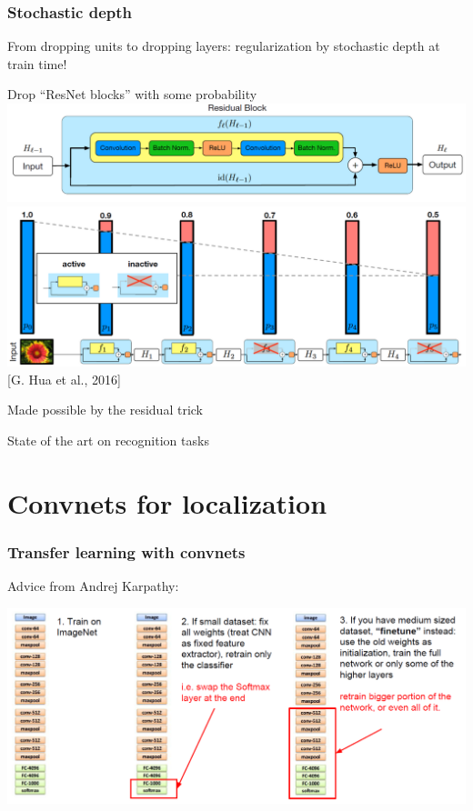 \documentclass[xcolor=dvipsnames]{beamer}
\begin{document}
\begin{frame}
  \frametitle{Stochastic depth}
  \bi
\item From dropping units to dropping layers: regularization by
  stochastic depth at train time!
\item Drop ``ResNet blocks'' with some probability
\includegraphics[width=.6\textwidth]{resblock}\\
\includegraphics[width=.6\textwidth]{stoch-depth}\\
{[G. Hua et al., 2016]}
\item Made possible by the residual trick
\item State of the art on recognition tasks
\ei
\end{frame}






\section{Convnets for localization}

\begin{frame}
  \frametitle{Transfer learning with convnets}
  \bi\item Advice from Andrej Karpathy:
\ei

\includegraphics[width=.9\textwidth]{ak-transfer} 
\end{frame}
\end{document}
